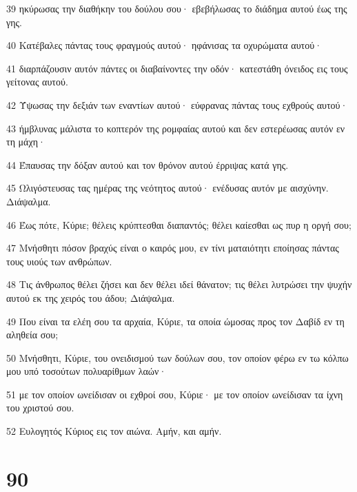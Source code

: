 \par 39 ηκύρωσας την διαθήκην του δούλου σου· εβεβήλωσας το διάδημα αυτού έως της γης.
\par 40 Κατέβαλες πάντας τους φραγμούς αυτού· ηφάνισας τα οχυρώματα αυτού·
\par 41 διαρπάζουσιν αυτόν πάντες οι διαβαίνοντες την οδόν· κατεστάθη όνειδος εις τους γείτονας αυτού.
\par 42 Ύψωσας την δεξιάν των εναντίων αυτού· εύφρανας πάντας τους εχθρούς αυτού·
\par 43 ήμβλυνας μάλιστα το κοπτερόν της ρομφαίας αυτού και δεν εστερέωσας αυτόν εν τη μάχη·
\par 44 Έπαυσας την δόξαν αυτού και τον θρόνον αυτού έρριψας κατά γης.
\par 45 Ωλιγόστευσας τας ημέρας της νεότητος αυτού· ενέδυσας αυτόν με αισχύνην. Διάψαλμα.
\par 46 Έως πότε, Κύριε; θέλεις κρύπτεσθαι διαπαντός; θέλει καίεσθαι ως πυρ η οργή σου;
\par 47 Μνήσθητι πόσον βραχύς είναι ο καιρός μου, εν τίνι ματαιότητι εποίησας πάντας τους υιούς των ανθρώπων.
\par 48 Τις άνθρωπος θέλει ζήσει και δεν θέλει ιδεί θάνατον; τις θέλει λυτρώσει την ψυχήν αυτού εκ της χειρός του άδου; Διάψαλμα.
\par 49 Που είναι τα ελέη σου τα αρχαία, Κύριε, τα οποία ώμοσας προς τον Δαβίδ εν τη αληθεία σου;
\par 50 Μνήσθητι, Κύριε, του ονειδισμού των δούλων σου, τον οποίον φέρω εν τω κόλπω μου υπό τοσούτων πολυαρίθμων λαών·
\par 51 με τον οποίον ωνείδισαν οι εχθροί σου, Κύριε· με τον οποίον ωνείδισαν τα ίχνη του χριστού σου.
\par 52 Ευλογητός Κύριος εις τον αιώνα. Αμήν, και αμήν.

\chapter{90}

